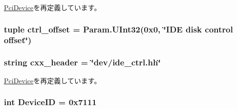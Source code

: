 \hyperlink{classPci_1_1PciDevice_a46090a927141f497918fd0c87f782395}{PciDevice}を再定義しています。\hypertarget{classIde_1_1IdeController_a598dd831b8f2ed1ab2858254aaa137e9}{
\subsubsection[{ctrl\_\-offset}]{\setlength{\rightskip}{0pt plus 5cm}tuple {\bf ctrl\_\-offset} = Param.UInt32(0x0, \char`\"{}IDE disk control offset\char`\"{})}}
\label{classIde_1_1IdeController_a598dd831b8f2ed1ab2858254aaa137e9}
\hypertarget{classIde_1_1IdeController_a17da7064bc5c518791f0c891eff05fda}{
\subsubsection[{cxx\_\-header}]{\setlength{\rightskip}{0pt plus 5cm}string {\bf cxx\_\-header} = \char`\"{}dev/ide\_\-ctrl.hh\char`\"{}}}
\label{classIde_1_1IdeController_a17da7064bc5c518791f0c891eff05fda}


\hyperlink{classPci_1_1PciDevice_a17da7064bc5c518791f0c891eff05fda}{PciDevice}を再定義しています。\hypertarget{classIde_1_1IdeController_a4a8ed9a0233fc6d0ce178569c4de25d0}{
\subsubsection[{DeviceID}]{\setlength{\rightskip}{0pt plus 5cm}int {\bf DeviceID} = 0x7111}}
\label{classIde_1_1IdeController_a4a8ed9a0233fc6d0ce178569c4de25d0}



